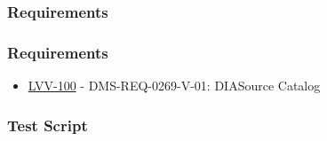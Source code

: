 \hypertarget{requirements-24}{%
\subsubsection{Requirements}\label{requirements-24}}

\hypertarget{requirements-25}{%
\subsubsection{Requirements}\label{requirements-25}}

\begin{itemize}
\tightlist
\item
  \href{https://jira.lsstcorp.org/browse/LVV-100}{LVV-100} -
  DMS-REQ-0269-V-01: DIASource Catalog
\end{itemize}

\hypertarget{test-script-12}{%
\subsubsection{Test Script}\label{test-script-12}}

